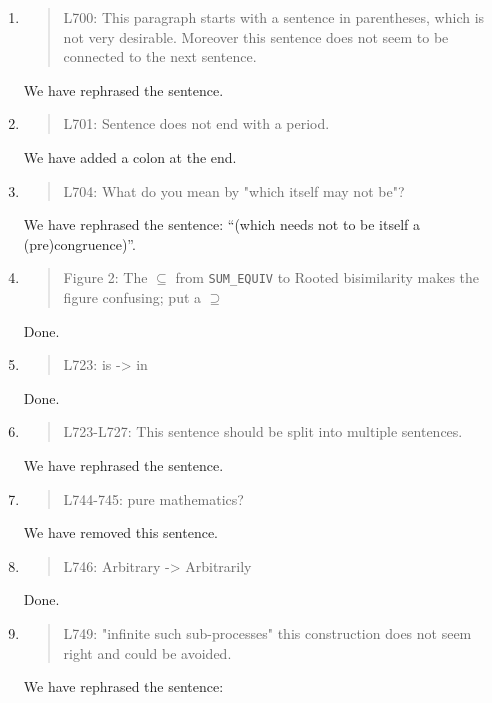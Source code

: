 \begin{enumerate}
\item \begin{quote}
    L700: This paragraph starts with a sentence in parentheses, which is not very desirable.
    Moreover this sentence does not seem to be connected to the next sentence.
  \end{quote}
  We have rephrased the sentence.
  
\item \begin{quote}
    L701: Sentence does not end with a period.
  \end{quote}
  We have added a colon at the end.
  
\item \begin{quote}
    L704: What do you mean by "which itself may not be"?
  \end{quote}
  We have rephrased the sentence: ``(which needs not to be itself a (pre)congruence)''.

\item \begin{quote}
    Figure 2: The $\subseteq$ from \texttt{SUM\_EQUIV} to Rooted
    bisimilarity makes the figure confusing; put a $\supseteq$
  \end{quote}
  Done.
  
\item \begin{quote}
    L723: is -> in
  \end{quote}
  Done.
  
\item \begin{quote}
    L723-L727: This sentence should be split into multiple sentences.
  \end{quote}
  We have rephrased the sentence.
  
\item \begin{quote}
    L744-745: pure mathematics?
  \end{quote}
  We have removed this sentence.
  
\item \begin{quote}
    L746: Arbitrary -> Arbitrarily
  \end{quote}
  Done.
  
\item \begin{quote}
    L749: "infinite such sub-processes" this construction does not seem right and could be avoided.
  \end{quote}
  We have rephrased the sentence: 
  

\end{enumerate}
